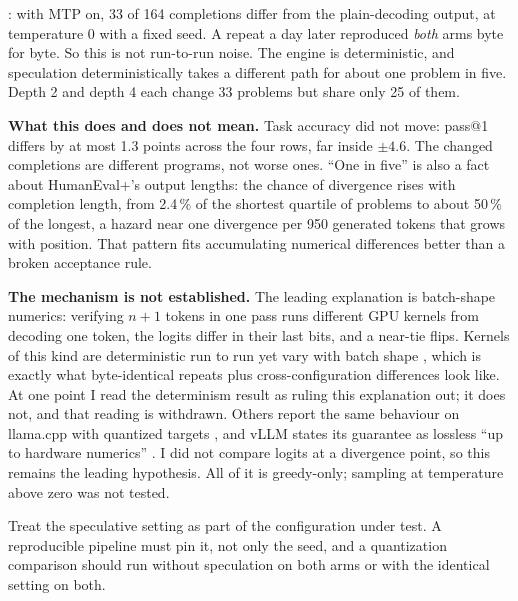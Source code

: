 : with MTP on, 33 of 164 completions differ from the plain-decoding output, at
temperature 0 with a fixed seed. A repeat a day later reproduced \emph{both} arms byte for byte. So
this is not run-to-run noise. The engine is deterministic, and speculation deterministically takes a
different path for about one problem in five. Depth 2 and depth 4 each change 33 problems but share
only 25 of them.

\textbf{What this does and does not mean.} Task accuracy did not move: pass@1 differs by at most 1.3
points across the four rows, far inside $\pm4.6$. The changed completions are different programs, not
worse ones. ``One in five'' is also a fact about HumanEval+'s output lengths: the chance of divergence
rises with completion length, from 2.4\,\% of the shortest quartile of problems to about 50\,\% of the
longest, a hazard near one divergence per 950 generated tokens that grows with position. That pattern
fits accumulating numerical differences better than a broken acceptance rule.

\textbf{The mechanism is not established.} The leading explanation is batch-shape numerics: verifying
$n{+}1$ tokens in one pass runs different GPU kernels from decoding one token, the logits differ in
their last bits, and a near-tie flips. Kernels of this kind are deterministic run to run yet vary with
batch shape \citep{thinkingmachines2025nondeterminism}, which is exactly what byte-identical repeats
plus cross-configuration differences look like. At one point I read the determinism result as ruling
this explanation out; it does not, and that reading is withdrawn. Others report the same behaviour on
llama.cpp with quantized targets \citep{llamacpp_issue25618}, and vLLM states its guarantee as
lossless ``up to hardware numerics'' \citep{vllm_specdecode_docs}. I did not compare logits at a
divergence point, so this remains the leading hypothesis. All of it is greedy-only; sampling at
temperature above zero was not tested.

\begin{takeaway}
Treat the speculative setting as part of the configuration under test. A reproducible pipeline must
pin it, not only the seed, and a quantization comparison should run without speculation on both arms
or with the identical setting on both.
\end{takeaway}

